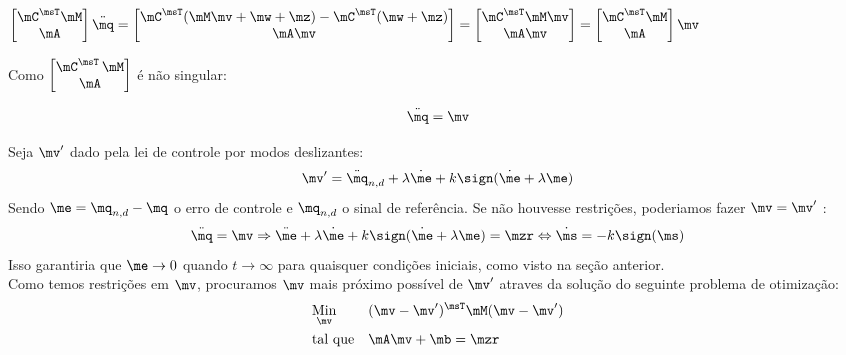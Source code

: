 $ \begin{bmatrix}
\mC^\msT \mM \\
\mA
\end{bmatrix}
\ddot{\mq}
=
\begin{bmatrix}
\mC^\msT ( \mM \mv + \mw + \mz ) - \mC^\msT(\mw + \mz) \\
\mA \mv
\end{bmatrix}
=
\begin{bmatrix}
\mC^\msT  \mM \mv \\
\mA \mv
\end{bmatrix}
=
\begin{bmatrix}
\mC^\msT \mM \\
\mA
\end{bmatrix}
\mv $

Como $\begin{bmatrix} \mC^\msT \, \mM \\ \mA \end{bmatrix}$ é não singular:

\begin{equation} \label{eq:ClosedLoopV}
\ddot{\mq} = \mv
\end{equation}

Seja $\mv'$ dado pela lei de controle por modos deslizantes:
\begin{equation} \label{eq:SMControlowLasV1'}
\mv' = \ddot{\mq}_{n, d} + \lambda \dot{\me} + k \sign (\dot{\me} + \lambda \me)
\end{equation}
Sendo $ \me = \mq_{n,d} - \mq $ o erro de controle e $\mq_{n,d}$ o sinal de refer\^encia. Se n\~ao houvesse restri\c{c}\~oes, poderiamos fazer $ \mv = \mv' $ :
$$ \ddot{\mq} = \mv \Rightarrow  \ddot{\me} + \lambda \dot{\me} + k \sign (\dot{\me} + \lambda \me) = \mzr \Leftrightarrow \dot{\ms} = - k \sign(\ms)$$
Isso garantiria que $\me \rightarrow 0$ quando $t \rightarrow \infty$ para quaisquer condi\c{c}\~oes iniciais, como visto na se\c{c}\~ao anterior. \\

Como temos restri\c{c}\~oes em $\mv$, procuramos $\mv$ mais pr\'oximo poss\'ivel de $\mv'$ atraves da solu\c{c}\~ao do seguinte problema de otimiza\c{c}\~ao:
\begin{equation} \label{eq:Optimization}
\begin{aligned}
& \underset{\mv}{\text{Min}}
& & (\mv - \mv')^\msT \mM (\mv - \mv') \\
& \text{tal que}
& & \mA \mv + \mb = \mzr
\end{aligned}
\end{equation}

